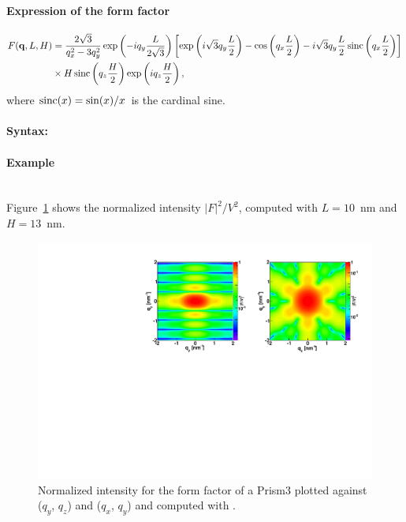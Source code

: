 \paragraph{Expression of the form factor}
\begin{align*}
F(\mathbf{q},L, H) &= \frac{2 \sqrt{3}}{q_x^2-3q_y^2}  \exp\left(-i q_y\frac{L}{2\sqrt{3}}\right)\left[\exp\left(i \sqrt{3} q_y \frac{L}{2} \right)-\cos\left(q_x \frac{L}{2}\right)-i \sqrt{3} q_y \frac{L}{2} \operatorname{sinc}\left(q_x \frac{L}{2}\right) \right] \\
  &
\times  H \operatorname{sinc}\left(q_z \frac{H}{2} \right) \exp\left(i q_z \frac{H}{2}\right),
\end{align*}
where $\operatorname{sinc}(x)=\sin(x)/x$ is the cardinal sine.

\paragraph{Syntax:} 

\paragraph{Example}\mbox{}\\
Figure~\ref{fig:FFprism3Ex} shows the normalized intensity
$|F|^2/V^2$, computed with $L=10$~nm and \mbox{$H=13$~nm.}
\begin{figure}[ht]
\begin{center}
\includegraphics[angle=-90,width=\textwidth]{Figures/ff/figffprism3.pdf}
\end{center}
\caption{Normalized intensity for the form factor of a Prism3
 plotted against ($q_y$, $q_z$) and  ($q_x$, $q_y$) and
  computed with .}
\label{fig:FFprism3Ex}
\end{figure}

